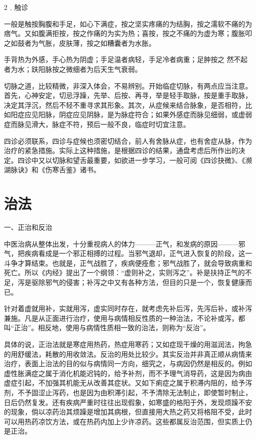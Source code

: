 \documentclass[12pt,UTF8]{ctexbook}
\begin{document}
2﹒触诊

一般是触按胸腹和手足，如心下满症，按之坚实疼痛的为结胸，按之濡软不痛的为痞气。又如腹满拒按，按之作痛的为实为热；喜按，按之不痛的为虚为寒；腹胀叩之如鼓者为气胀，皮肤薄，按之如糟囊者为水胀。

手背热为外感，手心热为阴虚；手足温者病轻，手足冷者病重；足肿按之 然不起者为水；趺阳脉按之微细者为后天生气衰弱。

切脉之道，比较精微，非深入体会，不易辨别。开始临症切脉，有两点应当注意。首先，心神安定，切忌浮躁，先举、后按、再寻，举是轻手取脉，按是重手取脉，决定其浮沉，然后不轻不重寻求其形象。其次，从症候来结合脉象，是否相符，比如阳症应见阳脉，阴症应见阴脉，是为脉症符合；如果外感症而脉见细弱，或虚弱症而脉见滑大，脉症不符，预后一般不良，临症时切宜注意。

四诊必须联系，四诊与症候也须密切结合，前人有舍脉从症，也有舍症从脉，作为治疗的紧急措施。实际上这种措施，是根据四诊的结果，通盘考虑后所作出的决定。四诊中又以切脉和望舌最重要，如欲进一步学习，一般可阅《四诊抉微》、《濒湖脉诀》和《伤寒舌鉴》诸书。

\section{治法}

一、正治和反治

中医治病从整体出发，十分重视病人的体力———正气，和发病的原因———邪气，把疾病看成是一个邪正相搏的过程。当邪气退却，正气进入恢复的阶段，这一斗争才算结束。也就是，正气战胜了，疾病便痊愈；邪气战胜了，就会导致病重和死亡。所以《内经》提出了一个纲领：“虚则补之，实则泻之”。补是扶持正气的不足，泻是驱除邪气的侵害；补泻之中又有各种方法，但目的只是一个，恢复健康而已。

针对着虚就用补，实就用泻，虚实同时存在，就考虑先补后泻，先泻后补，或补泻兼施。凡是从正面进行治疗，使用与病情相反性质的一种治法，不论补或泻，都叫“正治”。相反地，使用与病情性质相一致的治法，则称为“反治”。

具体的说，正治法就是寒症用热药，热症用寒药；又如症现干燥的用滋润法，拘急的用舒缓法，耗散的用收敛法。反治的用处比较少。其实反治并非真正顺从病情来治疗，表面上治法的目的似与病情同一方向，细究之，与病因仍然是相反的。例如虚性胀满症之属于消化机能迟钝的，给予补剂，而不予理气消导药，这是因为病由虚症引起，不加强其机能无从改善其症状。又如下痢症之属于积滞内阻的，给予泻剂，不予固涩止泻药，也是因为由积滞引起，不予清除无法制止，即使暂时制止，日后仍然复发。还有疾病严重时往往出现假象，如寒盛的格阳于外，发现烦躁不安的现象，倘以凉药治其烦躁是增加其病根，但直接用大热之药又将格阻不受，此时可以用热药凉饮方法，或在热药内加上少许凉药。这些都属反治范围，但实质上仍是正治。
\end{document}
